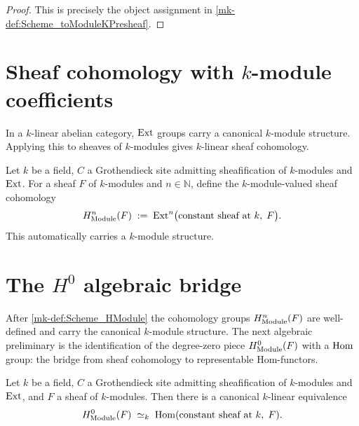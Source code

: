\begin{proof}
  \leanok

  This is precisely the object assignment in \ref{mk-def:Scheme_toModuleKPresheaf}.
\end{proof}

\section{Sheaf cohomology with \(k\)-module coefficients}
\label{mk-sec:HModule}

In a \(k\)-linear abelian category, \(\operatorname{Ext}\) groups carry a canonical \(k\)-module structure. Applying this to sheaves of \(k\)-modules gives \(k\)-linear sheaf cohomology.

\begin{definition}\label{mk-def:Scheme_HModule}
  \leanok


  Let \(k\) be a field, \(C\) a Grothendieck site admitting sheafification of \(k\)-modules and \(\operatorname{Ext}\). For a sheaf \(F\) of \(k\)-modules and \(n \in \mathbb N\), define the \(k\)-module-valued sheaf cohomology
  \[
    H^n_{\mathrm{Module}}(F) \;:=\; \operatorname{Ext}^n\bigl(\text{constant sheaf at }k,\; F\bigr).
  \]
  This automatically carries a \(k\)-module structure.
\end{definition}

\section{The \(H^0\) algebraic bridge}
\label{mk-sec:HModule_zero}

After \ref{mk-def:Scheme_HModule} the cohomology groups \(H^n_{\mathrm{Module}}(F)\) are well-defined and carry the canonical \(k\)-module structure. The next algebraic preliminary is the identification of the degree-zero piece \(H^0_{\mathrm{Module}}(F)\) with a \(\operatorname{Hom}\) group: the bridge from sheaf cohomology to representable Hom-functors.

\begin{definition}\label{mk-def:Scheme_HModule_zero_linearEquiv}
  \leanok


  Let \(k\) be a field, \(C\) a Grothendieck site admitting sheafification of \(k\)-modules and \(\operatorname{Ext}\), and \(F\) a sheaf of \(k\)-modules. Then there is a canonical \(k\)-linear equivalence
  \[
    H^0_{\mathrm{Module}}(F) \;\simeq_k\; \operatorname{Hom}(\text{constant sheaf at }k,\; F).
  \]
\end{definition}

